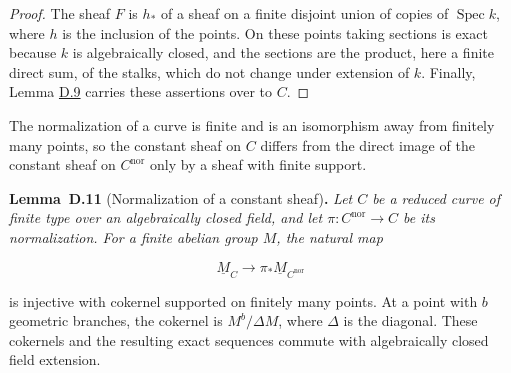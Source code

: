 \documentclass[11pt]{article}
\newenvironment{bpstatement}[2]{\par\addvspace{0.6\baselineskip}\noindent\textbf{#1}#2\textbf{.}\enspace\ignorespaces}
  {\par\addvspace{0.4\baselineskip}}
\newenvironment{bpstatementit}[2]{\begin{bpstatement}{#1}{#2}\itshape\ignorespaces}{\end{bpstatement}}
\begin{document}
\begin{proof}[{Proof}]\label{bp34}%
The sheaf \(F\) is \(h_*\) of a sheaf on a finite disjoint union of copies of \(\operatorname{Spec}k\), where \(h\) is the inclusion of the points. On these points taking sections is exact because \(k\) is algebraically closed, and the sections are the product, here a finite direct sum, of the stalks, which do not change under extension of \(k\). Finally, Lemma \hyperref[bp30]{D.9} carries these assertions over to \(C\).
\end{proof}

\label{bp35}%
The normalization of a curve is finite and is an isomorphism away from finitely many points, so the constant sheaf on \(C\) differs from the direct image of the constant sheaf on \(C^{\mathrm{nor}}\) only by a sheaf with finite support.

\label{bp36}%
\begin{bpstatementit}{Lemma~D.11}{ (Normalization of a constant sheaf)}
Let \(C\) be a reduced curve of finite type over an algebraically closed field, and let \(\pi:C^{\mathrm{nor}}\to C\) be its normalization.  For a finite abelian group \(M\), the natural map

\[
\underline M_C\longrightarrow \pi_*\underline M_{C^{\mathrm{nor}}}
\]

is injective with cokernel supported on finitely many points.  At a point with \(b\) geometric branches, the cokernel is \(M^b/\Delta M\), where \(\Delta\) is the diagonal. These cokernels and the resulting exact sequences commute with algebraically closed field extension.
\end{bpstatementit}
\end{document}
